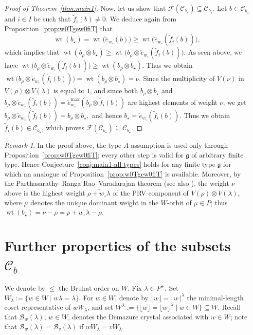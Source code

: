 \documentclass[reqno]{amsart}
\theoremstyle{definition}
\theoremstyle{remark}
\newtheorem{remark}[theorem]{Remark}
\numberwithin{equation}{section}
\newcommand{\g}{\mathfrak{g}}
\newcommand{\B}{\mathcal{B}}
\newcommand{\F}{\mathcal{F}}
\newcommand{\wt}{\operatorname{wt}}
\newcommand{\te}{\tilde e}
\newcommand{\tf}{\tilde f}
\newcommand{\chke}{\check e}
\newcommand{\bstar}{b_\star}
\begin{document}
\begin{proof}[Proof of Theorem~\ref{thm:main1}]
		Now, let us show that $\F(\mathcal{C}_{b_\star})\subseteq\mathcal{C}_{b_\star}$.
		Let $b\in \mathcal{C}_{b_\star}$ and $i\in I$ be such that $\tf_i(b)\ne0$.
		We deduce again from Proposition~\ref{prop:w0Tgew0fiT} that
		\[
		\wt(b_\star)=\wt\bigl(\chke_{w_\circ}(b)\bigr)\ge\wt\bigl(\chke_{w_\circ}(\tf_i(b))\bigr),
		\]
		which implies that $\wt(b_\rho\otimes b_\star)\ge\wt\bigl(b_\rho\otimes\chke_{w_\circ}(\tf_i(b))\bigr)$.
		As seen above, we have $\wt\bigl(b_\rho\otimes\chke_{w_\circ}(\tf_i(b))\bigr)\ge\wt(b_\rho\otimes b_\star)$.
		Thus we obtain $\wt\bigl(b_\rho\otimes\chke_{w_\circ}(\tf_i(b))\bigr)=\wt(b_\rho\otimes b_\star)=\nu.$
		Since the multiplicity of $V(\nu)$ in $V(\rho)\otimes V(\lambda)$ is equal to $1$,
		and since both $b_\rho\otimes b_{\star}$ and $b_\rho\otimes\chke_{w_\circ}(\tf_i(b))=\te_{w_\circ}^{\max}(b_\rho\otimes \tf_i(b))$ are highest elements of weight $\nu$,
		we get $b_\rho\otimes\chke_{w_\circ}(\tf_i(b))=b_\rho\otimes b_\star,$
		and hence $b_\star=\chke_{w_\circ}(\tf_i(b))$.
		Thus we obtain $\tf_i(b)\in \mathcal{C}_{b_\star}$, which proves $\F(\mathcal{C}_{\bstar})\subseteq\mathcal{C}_{\bstar}$.
	\end{proof}

	\begin{remark}
		In the proof above, the type $A$ assumption is used only through Proposition~\ref{prop:w0Tgew0fiT};
		every other step is valid for $\g$ of arbitrary finite type.
		Hence Conjecture~\ref{conj:main1-all-types} holds for any finite type $\g$ for which an analogue of
		Proposition~\ref{prop:w0Tgew0fiT} is available.
		Moreover, by the Parthasarathy--Ranga Rao--Varadarajan theorem \cite{prv1967}
		(see also \cite[\S3]{khare2012}), the weight $\nu$ above is the highest weight $\overline{\rho+w_\circ\lambda}$
		of the PRV component of $V(\rho)\otimes V(\lambda)$, where $\overline{\mu}$ denotes the unique dominant weight
		in the $W$-orbit of $\mu\in P$; thus $\wt(\bstar)=\nu-\rho=\overline{\rho+w_\circ\lambda}-\rho$.
	\end{remark}
	\appendix
	\section{Further properties of the subsets \texorpdfstring{$\mathcal{C}_b$}{C\_b}}\label{sec:applications}
	
	We denote by $\le$ the Bruhat order on $W$.
	Fix $\lambda\in P^+.$
	Set $W_\lambda:=\{w\in W\mid w\lambda=\lambda\}$.
	For $w\in W$, denote by $\lfloor w\rfloor=\lfloor w\rfloor^\lambda$ the minimal-length coset representative of $wW_\lambda$,
	and set $W^\lambda:=\{\lfloor w\rfloor=\lfloor w\rfloor^\lambda\mid w\in W\}\subseteq W$.
	Recall that $\B_w(\lambda)$, $w\in W$,
	denotes the Demazure crystal associated with $w\in W$;
	note that $\B_w(\lambda)=\B_v(\lambda)$ if $wW_\lambda=vW_\lambda$.
	
\end{document}
